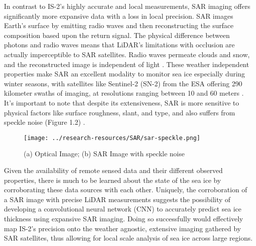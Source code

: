 In contrast to IS-2's highly accurate and local measurements, SAR imaging offers significantly more expansive data with a loss in local precision. SAR images Earth's surface by emitting radio waves and then reconstructing the surface composition based upon the return signal. The physical difference between photons and radio waves means that LiDAR's limitations with occlusion are actually imperceptible to SAR satellites. Radio waves permeate clouds and snow, and the reconstructed image is independent of light \cite{SAR-Info}. These weather independent properties make SAR an excellent modality to monitor sea ice especially during winter seasons, with satellites like Sentinel-2 (SN-2) from the ESA offering 290 kilometer swaths of imaging, at resolutions ranging between 10 and 60 meters \cite{Sentinel-2-Availability}. It's important to note that despite its extensiveness, SAR is more sensitive to physical factors like surface roughness, slant, and type, and also suffers from speckle noise (Figure 1.2) \cite{SAR-Info}. 

\begin{figure}[h]
	\centering
	\texttt{[image: ../research-resources/SAR/sar-speckle.png]}
	\caption[SAR Speckle Noise]{(a) Optical Image; (b) SAR Image with speckle noise}\cite{SAR-Speckle-Image}
\end{figure}

\indent Given the availability of remote sensed data and their different observed properties, there is much to be learned about the state of the sea ice by corroborating these data sources with each other. Uniquely, the corroboration of a SAR image with precise LiDAR measurements suggests the possibility of developing a convolutional neural network (CNN) to accurately predict sea ice thickness using expansive SAR imaging. Doing so successfully would effectively map IS-2's precision onto the weather agnostic, extensive imaging gathered by SAR satellites, thus allowing for local scale analysis of sea ice across large regions.


